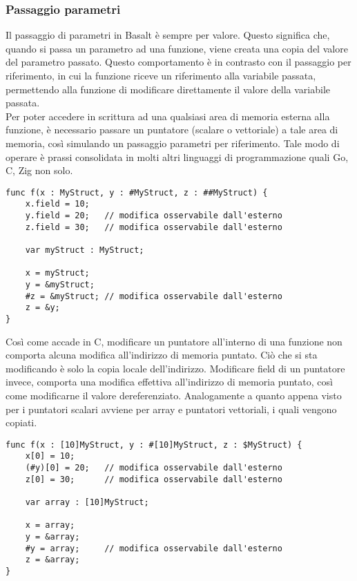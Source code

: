 \subsubsection{Passaggio parametri}
Il passaggio di parametri in Basalt è sempre per valore. Questo significa che, quando si passa un parametro ad una funzione, 
viene creata una copia del valore del parametro passato. Questo comportamento è in contrasto con il passaggio per riferimento, in cui la funzione 
riceve un riferimento alla variabile passata, permettendo alla funzione di modificare direttamente il valore della variabile passata. \\

Per poter accedere in scrittura ad una qualsiasi area di memoria esterna alla funzione, è necessario passare un puntatore (scalare o vettoriale)
a tale area di memoria, così simulando un passaggio parametri per riferimento. Tale modo di operare è prassi consolidata in molti altri linguaggi 
di programmazione quali Go, C, Zig non solo.\\

\vspace{0.5cm}
\begin{lstlisting}[frame=single]
func f(x : MyStruct, y : #MyStruct, z : ##MyStruct) {
    x.field = 10;
    y.field = 20;   // modifica osservabile dall'esterno
    z.field = 30;   // modifica osservabile dall'esterno

    var myStruct : MyStruct;

    x = myStruct;
    y = &myStruct;
    #z = &myStruct; // modifica osservabile dall'esterno
    z = &y;
}
\end{lstlisting}
\vspace{0.5cm}

Così come accade in C, modificare un puntatore all'interno di una funzione non comporta alcuna modifica all'indirizzo di memoria puntato. 
Ciò che si sta modificando è solo la copia locale dell'indirizzo. Modificare field di un puntatore invece, comporta una modifica effettiva
all'indirizzo di memoria puntato, così come modificarne il valore dereferenziato. Analogamente a quanto appena visto per i puntatori scalari 
avviene per array e puntatori vettoriali, i quali vengono copiati. \\

\vspace{0.5cm}
\begin{lstlisting}[frame=single]
func f(x : [10]MyStruct, y : #[10]MyStruct, z : $MyStruct) {
    x[0] = 10;
    (#y)[0] = 20;   // modifica osservabile dall'esterno
    z[0] = 30;      // modifica osservabile dall'esterno

    var array : [10]MyStruct;

    x = array;
    y = &array;
    #y = array;     // modifica osservabile dall'esterno
    z = &array;
}
\end{lstlisting}
\vspace{0.5cm}

\newpage
